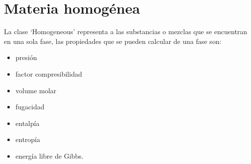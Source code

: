 \section{Materia homogénea}\label{sec:homogeneous}

	La clase `Homogeneous' representa a las substancias o mezclas que se encuentran en una sola fase, las propiedades que se pueden calcular de una fase son: 
\begin{itemize}
	\item presión
	\item factor compresibilidad 
	\item volume molar
	\item fugacidad	
	\item entalpía 
	\item entropía 
	\item energía libre de Gibbs.
\end{itemize}

